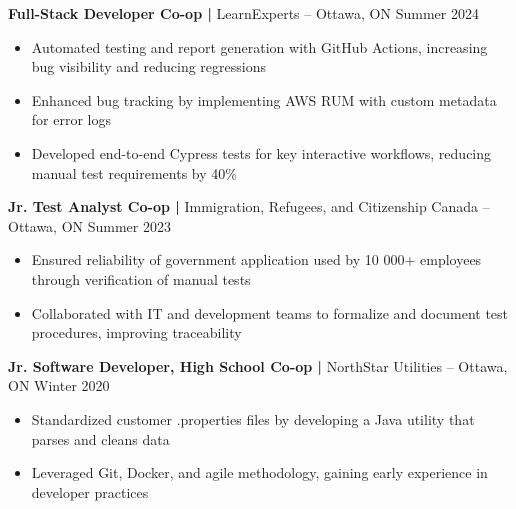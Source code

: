 \documentclass[11pt]{article}       %
\begin{document}
\textbf{Full-Stack Developer Co-op | } {LearnExperts} -- Ottawa, ON \hfill Summer 2024 \\
\vspace{-9pt}
\begin{itemize}
  \item Automated testing and report generation with GitHub Actions, increasing bug visibility and reducing regressions
  \item Enhanced bug tracking by implementing AWS RUM with custom metadata for error logs
  \item Developed end-to-end Cypress tests for key interactive workflows, reducing manual test requirements by 40\%
\end{itemize}

\textbf{Jr. Test Analyst Co-op | } {Immigration, Refugees, and Citizenship Canada} -- Ottawa, ON \hfill Summer 2023 \\
\vspace{-9pt}
\begin{itemize}
  \item Ensured reliability of government application used by 10 000+ employees through verification of manual tests
  \item Collaborated with IT and development teams to formalize and document test procedures, improving traceability
\end{itemize}

\textbf{Jr. Software Developer, High School Co-op | } {NorthStar Utilities} -- Ottawa, ON \hfill Winter 2020 \\
\vspace{-9pt}
\begin{itemize}
  \item Standardized customer .properties files by developing a Java utility that parses and cleans data
  \item Leveraged Git, Docker, and agile methodology, gaining early experience in developer practices
\end{itemize}

\vspace{-20.5pt}

\end{document}
